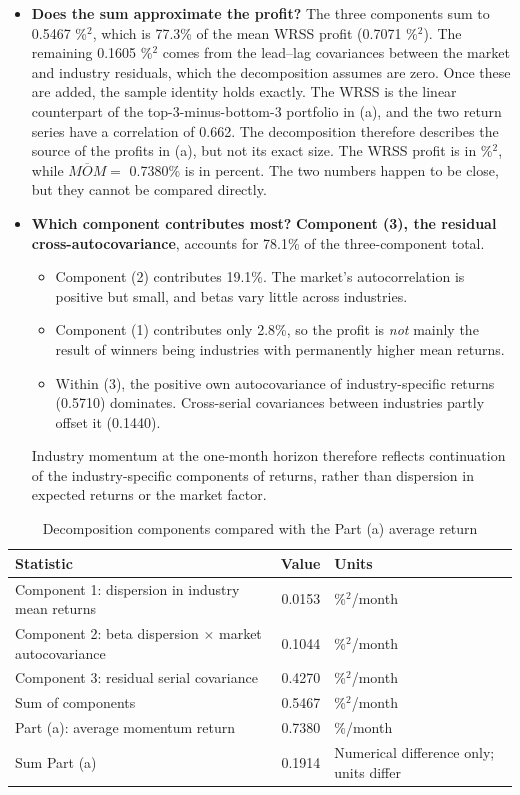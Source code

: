 \documentclass[11pt]{article}
\begin{document}
\begin{itemize}
  \item \textbf{Does the sum approximate the profit?} The three components sum to 0.5467 \%$^2$, which is 77.3\% of the mean WRSS profit (0.7071 \%$^2$). The remaining 0.1605 \%$^2$ comes from the lead--lag covariances between the market and industry residuals, which the decomposition assumes are zero. Once these are added, the sample identity holds exactly. The WRSS is the linear counterpart of the top-3-minus-bottom-3 portfolio in (a), and the two return series have a correlation of 0.662. The decomposition therefore describes the source of the profits in (a), but not its exact size. The WRSS profit is in \%$^2$, while $\overline{MOM}=$ 0.7380\% is in percent. The two numbers happen to be close, but they cannot be compared directly.
  \item \textbf{Which component contributes most?} \textbf{Component (3), the residual cross-autocovariance}, accounts for 78.1\% of the three-component total.
  \begin{itemize}
    \item Component (2) contributes 19.1\%. The market's autocorrelation is positive but small, and betas vary little across industries.
    \item Component (1) contributes only 2.8\%, so the profit is \emph{not} mainly the result of winners being industries with permanently higher mean returns.
    \item Within (3), the positive own autocovariance of industry-specific returns (0.5710) dominates. Cross-serial covariances between industries partly offset it (0.1440).
  \end{itemize}
 
  Industry momentum at the one-month horizon therefore reflects continuation of the industry-specific components of returns, rather than dispersion in expected returns or the market factor.
\end{itemize}
 
\begin{table}[H]
\centering
\caption{Decomposition components compared with the Part (a) average return}
\label{tab:compare}
\begin{tabularx}{\textwidth}{Xr>{\raggedright\arraybackslash}p{4.6cm}}
\toprule
Statistic & Value & Units \\
\midrule
Component 1: dispersion in industry mean returns & 0.0153 & \%$^2$/month \\
Component 2: beta dispersion $\times$ market autocovariance & 0.1044 & \%$^2$/month \\
Component 3: residual serial covariance & 0.4270 & \%$^2$/month \\
Sum of components & 0.5467 & \%$^2$/month \\
Part (a): average momentum return & 0.7380 & \%/month \\
Sum \textminus{} Part (a) & \textminus{}0.1914 & Numerical difference only; units differ \\
\bottomrule
\end{tabularx}
\end{table}
 
\end{document}
